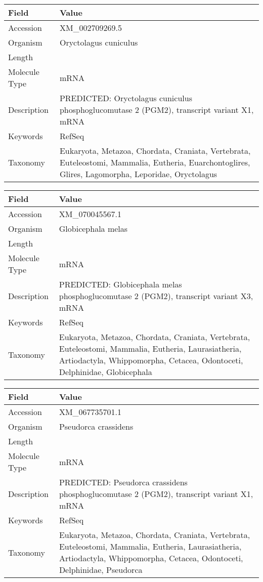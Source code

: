 \documentclass[10pt]{article}
\begin{document}
\vspace{1em}
{\footnotesize
\begin{longtable}{>{\raggedright\arraybackslash}p{4.5cm} >{\raggedright\arraybackslash}p{11.5cm}}
\textbf{Field} & \textbf{Value} \\
\hline
Accession & XM\_002709269.5 \\
Organism & Oryctolagus cuniculus \\
Length & 3759 \\
Molecule Type & mRNA \\
Description & PREDICTED: Oryctolagus cuniculus phosphoglucomutase 2 (PGM2), transcript variant X1, mRNA \\
Keywords & RefSeq \\
Taxonomy & Eukaryota, Metazoa, Chordata, Craniata, Vertebrata, Euteleostomi, Mammalia, Eutheria, Euarchontoglires, Glires, Lagomorpha, Leporidae, Oryctolagus \\
\end{longtable}
}

\vspace{1em}
{\footnotesize
\begin{longtable}{>{\raggedright\arraybackslash}p{4.5cm} >{\raggedright\arraybackslash}p{11.5cm}}
\textbf{Field} & \textbf{Value} \\
\hline
Accession & XM\_070045567.1 \\
Organism & Globicephala melas \\
Length & 6752 \\
Molecule Type & mRNA \\
Description & PREDICTED: Globicephala melas phosphoglucomutase 2 (PGM2), transcript variant X3, mRNA \\
Keywords & RefSeq \\
Taxonomy & Eukaryota, Metazoa, Chordata, Craniata, Vertebrata, Euteleostomi, Mammalia, Eutheria, Laurasiatheria, Artiodactyla, Whippomorpha, Cetacea, Odontoceti, Delphinidae, Globicephala \\
\end{longtable}
}

\vspace{1em}
{\footnotesize
\begin{longtable}{>{\raggedright\arraybackslash}p{4.5cm} >{\raggedright\arraybackslash}p{11.5cm}}
\textbf{Field} & \textbf{Value} \\
\hline
Accession & XM\_067735701.1 \\
Organism & Pseudorca crassidens \\
Length & 12693 \\
Molecule Type & mRNA \\
Description & PREDICTED: Pseudorca crassidens phosphoglucomutase 2 (PGM2), transcript variant X1, mRNA \\
Keywords & RefSeq \\
Taxonomy & Eukaryota, Metazoa, Chordata, Craniata, Vertebrata, Euteleostomi, Mammalia, Eutheria, Laurasiatheria, Artiodactyla, Whippomorpha, Cetacea, Odontoceti, Delphinidae, Pseudorca \\
\end{longtable}
}
\end{document}
